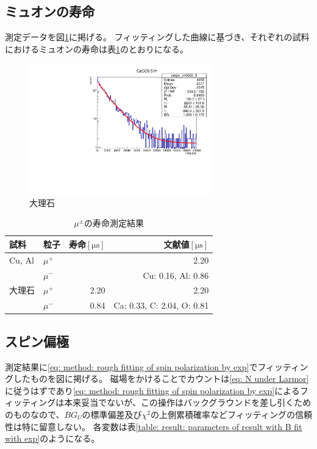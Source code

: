\documentclass[dvipdfmx]{jsarticle}
\begin{document}
\subsection{ミュオンの寿命}

測定データを図\ref{fig: result: CaCO3}に掲げる。
フィッティングした曲線に基づき、それぞれの試料におけるミュオンの寿命は表\ref{table: result: life}のとおりになる。

\begin{figure}
    \centering
    \includegraphics[width=8cm]{../analysis/Life/CaCO3for51h.pdf}
    \caption{大理石}
    \label{fig: result: CaCO3}
\end{figure}

\begin{table}
    \centering
    \caption{$\mu^\pm$の寿命測定結果}
    \begin{tabular}{llrr}
        \toprule
        試料 & 粒子 & 寿命$[\unit{\micro\second}]$ & 文献値$[\unit{\micro\second}]$
        \\
        \midrule
        Cu, Al & $\mu^+$ & & 2.20
        \\
         & $\mu^-$ & & Cu: 0.16, Al: 0.86
        \\
        大理石 & $\mu^+$ & 2.20 & 2.20
        \\
         & $\mu^-$ & 0.84 & Ca: 0.33, C: 2.04, O: 0.81
        \\
        \bottomrule
    \end{tabular}
    \label{table: result: life}
\end{table}


\subsection{スピン偏極}

測定結果に\eqref{eq: method: rough fitting of spin polarization by exp}でフィッティングしたものを図に掲げる。
磁場をかけることでカウントは\eqref{eq: N under Larmor}に従うはずであり\eqref{eq: method: rough fitting of spin polarization by exp}によるフィッティングは本来妥当でないが、この操作はバックグラウンドを差し引くためのものなので、$BG_U$の標準偏差及び$\chi^2$の上側累積確率などフィッティングの信頼性は特に留意しない。
各変数は表\ref{table: result: parameters of result with B fit with exp}のようになる。
\end{document}
